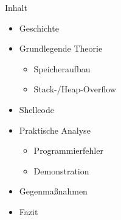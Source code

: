 \begin{frame}{Inhalt}
    \begin{itemize}
        \item Geschichte
        \item Grundlegende Theorie
        \begin{itemize}
            \item Speicheraufbau
            \item Stack-/Heap-Overflow
        \end{itemize}
        \item Shellcode
        \item Praktische Analyse
        \begin{itemize}
            \item Programmierfehler
            \item Demonstration
        \end{itemize}
        \item Gegenmaßnahmen
        \item Fazit
    \end{itemize}
\end{frame}